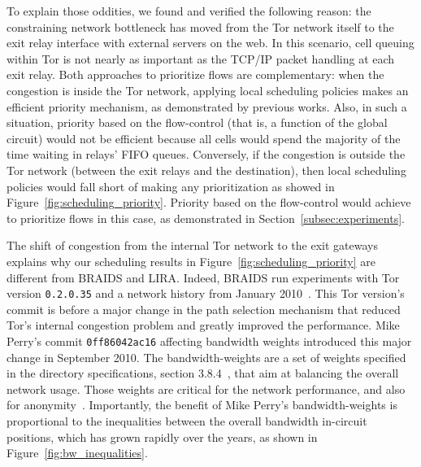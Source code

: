 To explain those oddities, we found and verified the following reason: the constraining network bottleneck has moved from the Tor network itself to the exit relay interface with external servers on the web.
In this scenario, cell queuing within Tor is not nearly as important as the TCP/IP packet handling at each exit relay.
Both approaches to prioritize flows are complementary: when the congestion is inside the Tor network, applying local scheduling policies makes an efficient priority mechanism, as demonstrated by previous works.
Also, in such a situation, priority based on the flow-control (that is, a function of the global circuit) would not be efficient because all cells would spend the majority of the time waiting in relays' FIFO queues.
Conversely, if the congestion is outside the Tor network (between the exit relays and the destination), then local scheduling policies would fall short of making any prioritization as showed in Figure~\ref{fig:scheduling_priority}.
Priority based on the flow-control would achieve to prioritize flows in this case, as demonstrated in Section~\ref{subsec:experiments}.

The shift of congestion from the internal Tor network to the exit gateways explains why our scheduling results in Figure~\ref{fig:scheduling_priority} are different from BRAIDS and LIRA.
Indeed, BRAIDS run experiments with Tor version \texttt{0.2.0.35} and a network history from January 2010~\cite{braids-repository}.
This Tor version's commit is before a major change in the path selection mechanism that reduced Tor's internal congestion problem and greatly improved the performance.
Mike Perry's commit \texttt{0ff86042ac16} affecting bandwidth weights introduced this major change in September 2010.
The bandwidth-weights are a set of weights specified in the directory specifications, section 3.8.4~\cite{dirspec}, that aim at balancing the overall network usage.
Those weights are critical for the network performance, and also for anonymity~\cite{waterfilling-pets2017, wf_proposal}.
Importantly, the benefit of Mike Perry's bandwidth-weights is proportional to the inequalities between the overall bandwidth in-circuit positions, which has grown rapidly over the years, as shown in Figure~\ref{fig:bw_inequalities}.

